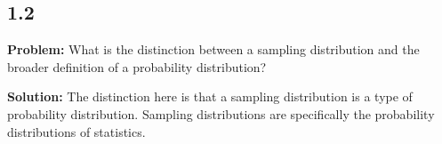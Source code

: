 \subsection*{1.2}

\textbf{Problem:} What is the distinction between a sampling distribution and the broader definition of a probability distribution?

\noindent\textbf{Solution:} The distinction here is that a sampling distribution is a type of probability distribution. Sampling distributions are specifically the probability distributions of statistics. 
